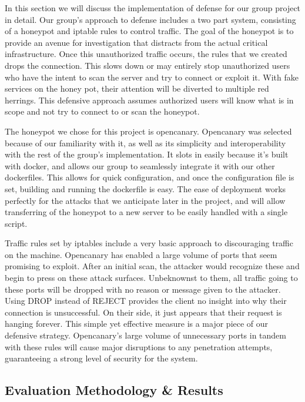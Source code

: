 In this section we will discuss the implementation of defense for our group project in detail. Our group's approach to defense includes a two part system, consisting of a honeypot and iptable rules to control traffic. The goal of the honeypot is to provide an avenue for investigation that distracts from the actual critical infrastructure. Once this unauthorized traffic occurs, the rules that we created drops the connection. This slows down or may entirely stop unauthorized users who have the intent to scan the server and try to connect or exploit it. With fake services on the honey pot, their attention will be diverted to multiple red herrings. This defensive approach assumes authorized users will know what is in scope and not try to connect to or scan the honeypot.

The honeypot we chose for this project is opencanary. Opencanary was selected because of our  familiarity with it, as well as its simplicity and interoperability with the rest of the group's implementation. It slots in easily because it’s built with docker, and allows our group to seamlessly integrate it with our other dockerfiles. This allows for quick configuration, and once the configuration file is set, building and running the dockerfile is easy. The ease of deployment works perfectly for the attacks that we anticipate later in the project, and will allow transferring of the honeypot to a new server to be easily handled with a single script. 

Traffic rules set by iptables include a very basic approach to discouraging traffic on the machine. Opencanary has enabled a large volume of ports that seem promising to exploit. After an initial scan, the attacker would recognize these and begin to press on these attack surfaces. Unbeknownst to them, all traffic going to these ports will be dropped with no reason or message given to the attacker. Using DROP instead of REJECT provides the client no insight into why their connection is unsuccessful. On their side, it just appears that their request is hanging forever. This simple yet effective measure is a major piece of our defensive strategy. Opencanary’s large volume of unnecessary ports in tandem with these rules will cause major disruptions to any penetration attempts, guaranteeing a strong level of security for the system. 

\subsection{Evaluation Methodology \& Results}


